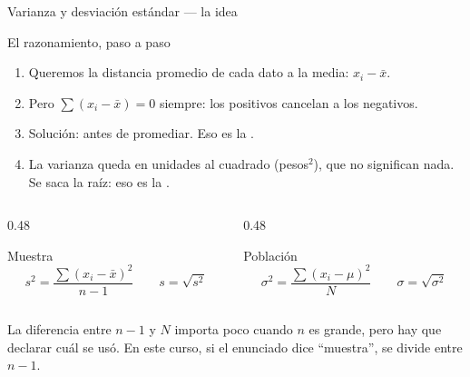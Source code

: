 \documentclass[aspectratio=169,10pt]{beamer}
\begin{document}
\begin{frame}{Varianza y desviación estándar — la idea}
  \footnotesize
  \begin{block}{El razonamiento, paso a paso}
    \scriptsize
    \begin{enumerate}\setlength{\itemsep}{-0.05cm}
      \item Queremos la distancia promedio de cada dato a la media:
            $x_i - \bar{x}$.
      \item Pero $\sum(x_i - \bar{x}) = 0$ siempre: los positivos cancelan a
            los negativos.
      \item Solución:  antes de promediar. Eso es la
            .
      \item La varianza queda en unidades al cuadrado (pesos$^2$), que no
            significan nada. Se saca la raíz: eso es la .
    \end{enumerate}
  \end{block}

  \vspace{0.1cm}
  \begin{columns}[T,onlytextwidth]
    \begin{column}{0.48\textwidth}
      \begin{exampleblock}{Muestra}
        \scriptsize
        \[ s^2 = \frac{\sum (x_i-\bar{x})^2}{n-1} \qquad s = \sqrt{s^2} \]
      \end{exampleblock}
    \end{column}
    \begin{column}{0.48\textwidth}
      \begin{exampleblock}{Población}
        \scriptsize
        \[ \sigma^2 = \frac{\sum (x_i-\mu)^2}{N} \qquad \sigma = \sqrt{\sigma^2} \]
      \end{exampleblock}
    \end{column}
  \end{columns}

  \vspace{0.05cm}
  {\tiny\color{uniGris} La diferencia entre $n-1$ y $N$ importa poco cuando $n$
  es grande, pero hay que declarar cuál se usó. En este curso, si el enunciado
  dice ``muestra'', se divide entre $n-1$.}
\end{frame}
\end{document}
